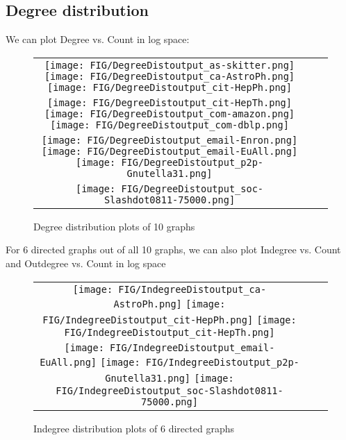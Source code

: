 \subsection{Degree distribution}
We can plot Degree vs. Count in log space:

\begin{figure}[H]
\begin{center}
\begin{tabular}{ccc}
     \texttt{[image: FIG/DegreeDistoutput\_as-skitter.png]} 
     \texttt{[image: FIG/DegreeDistoutput\_ca-AstroPh.png]}
     \texttt{[image: FIG/DegreeDistoutput\_cit-HepPh.png]} \\
     \texttt{[image: FIG/DegreeDistoutput\_cit-HepTh.png]} 
     \texttt{[image: FIG/DegreeDistoutput\_com-amazon.png]} 
     \texttt{[image: FIG/DegreeDistoutput\_com-dblp.png]} \\
     \texttt{[image: FIG/DegreeDistoutput\_email-Enron.png]} 
     \texttt{[image: FIG/DegreeDistoutput\_email-EuAll.png]} 
     \texttt{[image: FIG/DegreeDistoutput\_p2p-Gnutella31.png]} \\
     \texttt{[image: FIG/DegreeDistoutput\_soc-Slashdot0811-75000.png]} 
\end{tabular}
\caption{Degree distribution plots of 10 graphs}
\label{fig:results}
\end{center}
\end{figure}

For 6 directed graphs out of all 10 graphs, we can also plot Indegree vs. Count and Outdegree vs. Count in log space

\begin{figure}[H]
\begin{center}
\begin{tabular}{ccc}
     \texttt{[image: FIG/IndegreeDistoutput\_ca-AstroPh.png]}
     \texttt{[image: FIG/IndegreeDistoutput\_cit-HepPh.png]} 
     \texttt{[image: FIG/IndegreeDistoutput\_cit-HepTh.png]} \\
     \texttt{[image: FIG/IndegreeDistoutput\_email-EuAll.png]} 
     \texttt{[image: FIG/IndegreeDistoutput\_p2p-Gnutella31.png]} 
     \texttt{[image: FIG/IndegreeDistoutput\_soc-Slashdot0811-75000.png]} 
\end{tabular}
\caption{Indegree distribution plots of 6 directed graphs}
\label{fig:results}
\end{center}
\end{figure}

